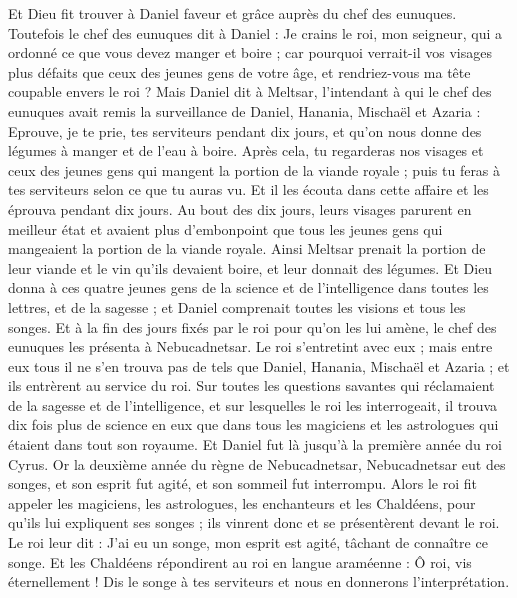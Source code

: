 \begin{multicols}{2}
Et Dieu fit trouver à Daniel faveur et grâce auprès du chef des eunuques. 
Toutefois le chef des eunuques dit à Daniel : Je crains le roi, mon seigneur, qui a ordonné ce que vous devez manger et boire ; car pourquoi verrait-il vos visages plus défaits que ceux des jeunes gens de votre âge, et rendriez-vous ma tête coupable envers le roi ?
Mais Daniel dit à Meltsar, l'intendant à qui le chef des eunuques avait remis la surveillance de Daniel, Hanania, Mischaël et Azaria :
Eprouve, je te prie, tes serviteurs pendant dix jours, et qu'on nous donne des légumes à manger et de l'eau à boire.
Après cela, tu regarderas nos visages et ceux des jeunes gens qui mangent la portion de la viande royale ; puis tu feras à tes serviteurs selon ce que tu auras vu.
Et il les écouta dans cette affaire et les éprouva pendant dix jours.
Au bout des dix jours, leurs visages parurent en meilleur état et avaient plus d'embonpoint que tous les jeunes gens qui mangeaient la portion de la viande royale.
 Ainsi Meltsar prenait la portion de leur viande et le vin qu'ils devaient boire, et leur donnait des légumes.
Et Dieu donna à ces quatre jeunes gens de la science et de l'intelligence dans toutes les lettres, et de la sagesse ; et Daniel comprenait toutes les visions et tous les songes.
Et à la fin des jours fixés par le roi pour qu'on les lui amène, le chef des eunuques les présenta à Nebucadnetsar.
Le roi s'entretint avec eux ; mais entre eux tous il ne s'en trouva pas de tels que Daniel, Hanania, Mischaël et Azaria ; et ils entrèrent au service du roi.
Sur toutes les questions savantes qui réclamaient de la sagesse et de l'intelligence, et sur lesquelles le roi les interrogeait, il trouva dix fois plus de science en eux que dans tous les magiciens et les astrologues qui étaient dans tout son royaume.
Et Daniel fut là jusqu'à la première année du roi Cyrus.
\VerseOne{}Or la deuxième année du règne de Nebucadnetsar, Nebucadnetsar eut des songes, et son esprit fut agité, et son sommeil fut interrompu.
Alors le roi fit appeler les magiciens, les astrologues, les enchanteurs et les Chaldéens, pour qu'ils lui expliquent ses songes ; ils vinrent donc et se présentèrent devant le roi.
Le roi leur dit : J'ai eu un songe, mon esprit est agité, tâchant de connaître ce songe.
Et les Chaldéens répondirent au roi en langue araméenne : Ô roi, vis éternellement ! Dis le songe à tes serviteurs et nous en donnerons l'interprétation.

\end{multicols}
